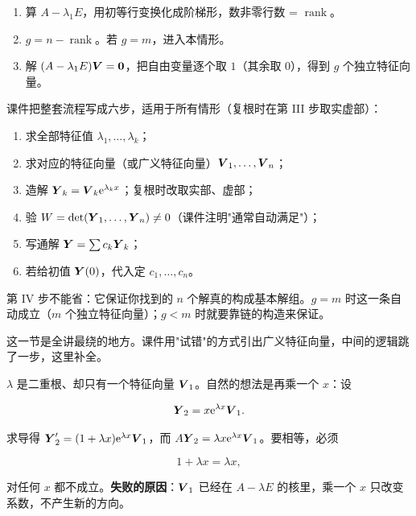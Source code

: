 \documentclass[11pt]{ctexart}
\newcommand{\rank}{\operatorname{rank}}
\begin{document}

\begin{enumerate}
  \item 算 $A-\lambda_1E$，用初等行变换化成阶梯形，数非零行数 = $\rank$。
  \item $g=n-\rank$。若 $g=m$，进入本情形。
  \item 解 $(A-\lambda_1E)\boldsymbol{V}=\boldsymbol{0}$，把自由变量逐个取 $1$（其余取 $0$），得到 $g$ 个独立特征向量。
\end{enumerate}


课件把整套流程写成六步，适用于所有情形（复根时在第 III 步取实虚部）：

\begin{enumerate}
  \item 求全部特征值 $\lambda_1,\dots,\lambda_k$；
  \item 求对应的特征向量（或广义特征向量）$\boldsymbol{V}_1,\dots,\boldsymbol{V}_n$；
  \item 造解 $\boldsymbol{Y}_k=\boldsymbol{V}_k\mathrm{e}^{\lambda_kx}$；复根时改取实部、虚部；
  \item 验 $W=\det(\boldsymbol{Y}_1,\dots,\boldsymbol{Y}_n)\neq0$（课件注明"通常自动满足"）；
  \item 写通解 $\boldsymbol{Y}=\sum c_k\boldsymbol{Y}_k$；
  \item 若给初值 $\boldsymbol{Y}(0)$，代入定 $c_1,\dots,c_n$。
\end{enumerate}

第 IV 步不能省：它保证你找到的 $n$ 个解真的构成基本解组。$g=m$ 时这一条自动成立（$m$ 个独立特征向量）；$g<m$ 时就要靠链的构造来保证。


这一节是全讲最绕的地方。课件用"试错"的方式引出广义特征向量，中间的逻辑跳了一步，这里补全。


$\lambda$ 是二重根、却只有一个特征向量 $\boldsymbol{V}_1$。自然的想法是再乘一个 $x$：设

\[
\boldsymbol{Y}_2=x\mathrm{e}^{\lambda x}\boldsymbol{V}_1 .
\]

求导得 $\boldsymbol{Y}_2'=(1+\lambda x)\mathrm{e}^{\lambda x}\boldsymbol{V}_1$，而 $A\boldsymbol{Y}_2=\lambda x\mathrm{e}^{\lambda x}\boldsymbol{V}_1$。要相等，必须

\[
1+\lambda x=\lambda x,
\]

对任何 $x$ 都不成立。\textbf{失败的原因}：$\boldsymbol{V}_1$ 已经在 $A-\lambda E$ 的核里，乘一个 $x$ 只改变系数，不产生新的方向。
\end{document}
